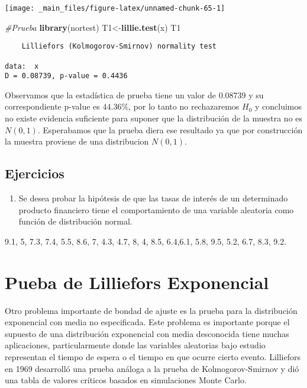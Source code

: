 \documentclass[
  a4paper,
  oneside,
  openany]{book}
\newenvironment{Shaded}{\begin{snugshade}}{\end{snugshade}}
\newcommand{\CommentTok}[1]{\textcolor[rgb]{0.56,0.35,0.01}{\textit{#1}}}
\newcommand{\KeywordTok}[1]{\textcolor[rgb]{0.13,0.29,0.53}{\textbf{#1}}}
\newcommand{\NormalTok}[1]{#1}
\providecommand{\tightlist}{%
  \setlength{\itemsep}{0pt}\setlength{\parskip}{0pt}}
\begin{document}
\begin{center}\texttt{[image: \_main\_files/figure-latex/unnamed-chunk-65-1]} \end{center}

\begin{Shaded}
\begin{Highlighting}[]
\CommentTok{\#Prueba}
\KeywordTok{library}\NormalTok{(nortest) }
\NormalTok{T1\textless{}{-}}\KeywordTok{lillie.test}\NormalTok{(x)}
\NormalTok{T1}
\end{Highlighting}
\end{Shaded}

\begin{verbatim}
    Lilliefors (Kolmogorov-Smirnov) normality test

data:  x
D = 0.08739, p-value = 0.4436
\end{verbatim}

Observamos que la estadística de prueba tiene un valor de 0.08739 y su correspondiente p-value es \(44.36\%\), por lo tanto no rechazaremos \(H_0\) y concluimos no existe evidencia suficiente para suponer que la distribución de la muestra no es \(N(0,1)\). Esperabamos que la prueba diera ese resultado ya que por construcción la muestra proviene de una distribucion \(N(0,1)\).

\hypertarget{ejercicios-11}{%
\section{Ejercicios}\label{ejercicios-11}}

\begin{enumerate}
\def\labelenumi{\arabic{enumi}.}
\tightlist
\item
  Se desea probar la hipótesis de que las tasas de interés de un determinado producto financiero tiene el comportamiento de una variable aleatoria como función de distribución normal.
\end{enumerate}

9.1, 5, 7.3, 7.4, 5.5, 8.6, 7, 4.3, 4.7, 8,
4, 8.5, 6.4,6.1, 5.8, 9.5, 5.2, 6.7, 8.3, 9.2.

\hypertarget{pueba-de-lilliefors-exponencial}{%
\chapter{Pueba de Lilliefors Exponencial}\label{pueba-de-lilliefors-exponencial}}

Otro problema importante de bondad de ajuste es la prueba para la distribución exponencial con media no especificada. Este problema es importante porque el supuesto de una distribución exponencial con media desconocida tiene muchas aplicaciones, particularmente donde las variables aleatorias bajo estudio representan el tiempo de espera o el tiempo en que ocurre cierto evento.
Lilliefors en 1969 desarrolló una prueba análoga a la prueba de Kolmogorov-Smirnov y dió una tabla de valores críticos basados en simulaciones Monte Carlo.
\end{document}
